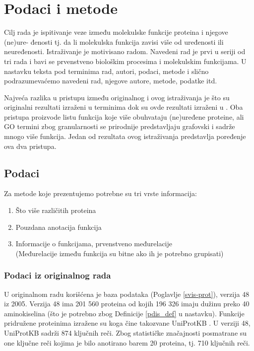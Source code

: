 
\chapter{Podaci i metode} %

\label{Podaci i metode} %

Cilj rada je ispitivanje veze između molekulske funkcije proteina i njegove
(ne)ure- đenosti tj. da li molekulska funkcija zavisi više od uređenosti ili
neuređenosti. Istraživanje je motivisano radom\parencite{Xie2007}. Navedeni rad
je prvi u seriji od tri rada i bavi se prvenstveno biološkim procesima i
molekulskim funkcijama.  U nastavku teksta pod terminima 
rad, autori, podaci, metode i slično podrazumevaćemo navedeni rad, njegove
autore, metode, podatke itd.

Najveća razlika u pristupu između originalnog i ovog istraživanja je što su
originalni rezultati izraženi u terminima  dok su ovde
rezultati izraženi u . Oba pristupa proizvode listu
funkcija koje više obuhvataju (ne)uređene proteine, ali GO termini zbog
granularnosti se prirodnije predstavljaju grafovski i sadrže mnogo više
funkcija. Jedan od rezultata ovog istraživanja predstavlja poređenje ova dva
pristupa.


\section {Podaci}

Za metode koje prezentujemo potrebne su tri vrste informacija:
\begin{enumerate}
  \item Što više različitih proteina
  \item Pouzdana anotacija funkcija
  \item Informacije o funkcijama, prvenstveno međurelacije\\
    (Međurelacije između funkcija su bitne  ako ih je potrebno grupisati)
\end{enumerate}


\subsection{Podaci iz originalnog rada}

U originalnom radu \parencite{Xie2007} korišćena je  baza podataka 
\keyword{\swissprot} (Poglavlje \ref{svis-prot}), verzija 48 iz 2005.
Verzija 48 ima 201 560 proteina od kojih 196 326 imaju dužinu preko 40
aminokiselina (što je potrebno zbog Definicije \ref{pdis_def} u nastavku). Funkcije
pridružene proteinima izražene su 
 koga čine takozvane UniProtKB 
. U verziji 48, UniProtKB sadrži 874 ključnih reči.  Zbog
statističke značajnosti posmatrane su one ključne reči kojima je bilo anotirano
barem 20 proteina, tj. 710 ključnih reči.

